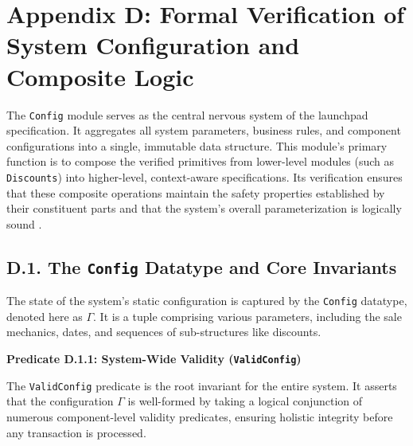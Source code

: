 \documentclass[
  english,
  onecolumn]{article}
\begin{document}
\section{Appendix D: Formal Verification of System Configuration and
Composite
Logic}\label{appendix-d-formal-verification-of-system-configuration-and-composite-logic}

The \texttt{Config} module serves as the central nervous system of the
launchpad specification. It aggregates all system parameters, business
rules, and component configurations into a single, immutable data
structure. This module's primary function is to compose the verified
primitives from lower-level modules (such as \texttt{Discounts}) into
higher-level, context-aware specifications. Its verification ensures
that these composite operations maintain the safety properties
established by their constituent parts and that the system's overall
parameterization is logically sound \citep{almeida2007compositional}.

\subsection{\texorpdfstring{D.1. The \texttt{Config} Datatype and Core
Invariants}{D.1. The Config Datatype and Core Invariants}}\label{d.1.-the-config-datatype-and-core-invariants}

The state of the system's static configuration is captured by the
\texttt{Config} datatype, denoted here as \(\Gamma\). It is a tuple
comprising various parameters, including the sale mechanics, dates, and
sequences of sub-structures like discounts.

\textbf{Predicate D.1.1: System-Wide Validity (\texttt{ValidConfig})}

The \texttt{ValidConfig} predicate is the root invariant for the entire
system. It asserts that the configuration \(\Gamma\) is well-formed by
taking a logical conjunction of numerous component-level validity
predicates, ensuring holistic integrity before any transaction is
processed.
\end{document}

